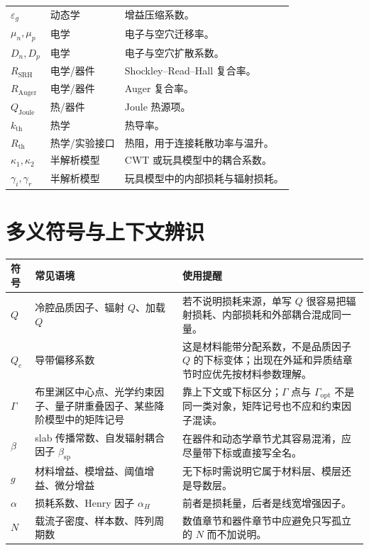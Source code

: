 \begin{longtable}{@{}p{}p{}p{}@{}}
$\varepsilon_g$ & 动态学 & 增益压缩系数。 \\
$\mu_n,\mu_p$ & 电学 & 电子与空穴迁移率。 \\
$D_n,D_p$ & 电学 & 电子与空穴扩散系数。 \\
$R_\mathrm{SRH}$ & 电学/器件 & Shockley--Read--Hall 复合率。 \\
$R_\mathrm{Auger}$ & 电学/器件 & Auger 复合率。 \\
$Q_\mathrm{Joule}$ & 热/器件 & Joule 热源项。 \\
$k_\mathrm{th}$ & 热学 & 热导率。 \\
$R_\mathrm{th}$ & 热学/实验接口 & 热阻，用于连接耗散功率与温升。 \\
$\kappa_1,\kappa_2$ & 半解析模型 & CWT 或玩具模型中的耦合系数。 \\
$\gamma_i,\gamma_r$ & 半解析模型 & 玩具模型中的内部损耗与辐射损耗。 \\
\bottomrule
\end{longtable}

\section{多义符号与上下文辨识}
\begin{longtable}{@{}p{}p{}p{}@{}}
\toprule
符号 & 常见语境 & 使用提醒 \\ \midrule
\endhead
$Q$ & 冷腔品质因子、辐射 $Q$、加载 $Q$ & 若不说明损耗来源，单写 $Q$ 很容易把辐射损耗、内部损耗和外部耦合混成同一量。 \\
$Q_c$ & 导带偏移系数 & 这是材料能带分配系数，不是品质因子 $Q$ 的下标变体；出现在外延和异质结章节时应优先按材料参数理解。 \\
$\Gamma$ & 布里渊区中心点、光学约束因子、量子阱重叠因子、某些降阶模型中的矩阵记号 & 靠上下文或下标区分；$\Gamma$ 点与 $\Gamma_\mathrm{opt}$ 不是同一类对象，矩阵记号也不应和约束因子混读。 \\
$\beta$ & slab 传播常数、自发辐射耦合因子 $\beta_\mathrm{sp}$ & 在器件和动态学章节尤其容易混淆，应尽量带下标或直接写全名。 \\
$g$ & 材料增益、模增益、阈值增益、微分增益 & 无下标时需说明它属于材料层、模层还是导数层。 \\
$\alpha$ & 损耗系数、Henry 因子 $\alpha_H$ & 前者是损耗量，后者是线宽增强因子。 \\
$N$ & 载流子密度、样本数、阵列周期数 & 数值章节和器件章节中应避免只写孤立的 $N$ 而不加说明。 \\
\bottomrule
\end{longtable}

